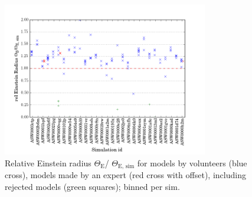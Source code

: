\documentclass[12pt,preprint]{aastex}
\newcommand{\ERg}[1][]{$\Theta_{\text{E#1}}$\xspace} %
\newcommand{\ERf}[1][]{Einstein radius $\Theta_\text{E#1}$\xspace} %
\begin{document}
\begin{figure}[htbp]
  \centering
    \includegraphics[width=0.80\textwidth]{fig/eR_4}
  \caption{Relative \ERf / \ERg[, sim] for models by volunteers (blue cross), models made by an expert (red cross with offset), including rejected models (green squares); binned per sim.}
  \label{fig:ER_per_sim}
\end{figure}
\end{document}
